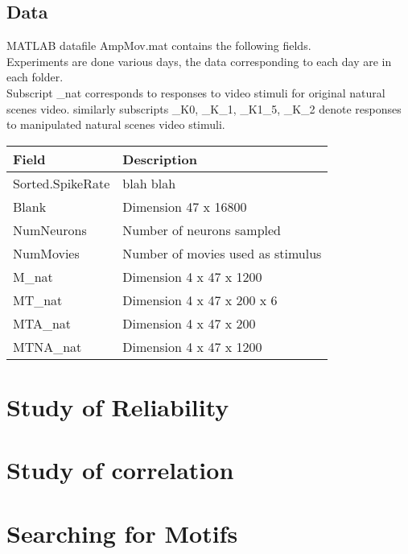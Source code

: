 \documentclass[11pt]{article}
\begin{document}
\subsection{Data} %
\label{sub:data}
MATLAB datafile AmpMov.mat contains the following fields.\\
Experiments are done various days, the data corresponding to each day are in each folder.\\
Subscript \_nat corresponds to responses to video stimuli for original natural scenes video. similarly subscripts \_K0, \_K\_1, \_K1\_5, \_K\_2 denote responses to manipulated natural scenes video stimuli.
\begin{center}
    \begin{tabular}{|l|l|}
        \hline
        Field                                 & Description \\
        \hline
        Sorted.SpikeRate                  & blah blah \\
        Blank                             & Dimension 47 x 16800 \\
        NumNeurons                        & Number of neurons sampled \\
        NumMovies                         & Number of movies used as stimulus \\
        M\_nat                            & Dimension 4 x 47 x 1200 \\
        MT\_nat                           & Dimension 4 x 47 x 200 x 6 \\
        MTA\_nat                          & Dimension 4 x 47 x 200 \\
        MTNA\_nat                         & Dimension 4 x 47 x 1200 \\
        \hline    
    \end{tabular}
\end{center}


\section{Study of Reliability} %
\label{sec:study_of_reliability}


\section{Study of correlation} %
\label{sec:study_of_correlation}


\section{Searching for Motifs} %
\label{sec:searching_for_motifs}

\end{document}
